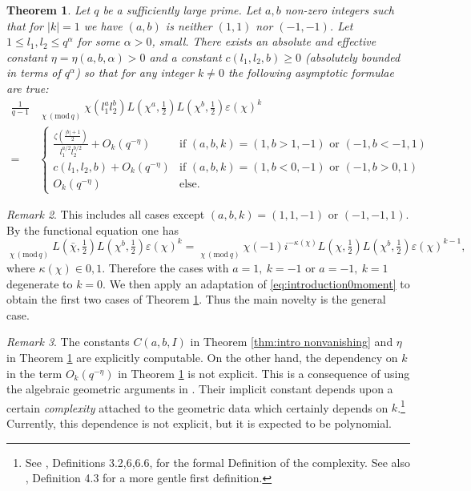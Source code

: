 \documentclass[12pt]{amsart}
\theoremstyle{plain}
\newtheorem{thm}{Theorem}[section]
\theoremstyle{definition}
\theoremstyle{remark}
\newtheorem{rem}[thm]{Remark}
\numberwithin{equation}{section}
\newcommand\sumst{\mathop{{\sum}^\ast}\limits}
\newcommand{\mods}[1]{\,(\mathrm{mod}\,{#1})}
\renewcommand{\geq}{\geqslant}
\renewcommand{\leq}{\leqslant}
\begin{document}
\begin{thm}\label{thm:introduction1}
    Let $q$ be a sufficiently large prime. Let $a,b$ non-zero integers such that for $|k|=1$ we have $(a,b)$ is neither $(1,1)$ nor $(-1,-1)$. Let $1\leq l_1,l_2\leq q^\alpha$ for some $\alpha>0$, small. There exists an absolute and effective constant $\eta = \eta(a,b,\alpha) > 0$ and a constant $c(l_1,l_2,b)\geq0$ (absolutely bounded in terms of $q^\alpha$) so that for any integer $k\neq 0$ the following asymptotic formulae are true:
    \begin{align*}
        \frac{1}{q-1}&\sumst_{\chi \mods{q}}\chi(l_1^al_2^b)L\left(\chi^a,\tfrac{1}{2}\right)L\left(\chi^b,\tfrac{1}{2}\right)\varepsilon(\chi)^k \\ 
     =&\begin{cases} \frac{\zeta\left(\frac{|b|+1}{2}\right)}{l_1^{a/2}l_2^{b/2}}+ O_k( q^{-\eta}) &\text{if }(a,b,k)=(1,b>1,-1) \text{ or } (-1,b<-1,1) \\
          c(l_1,l_2,b)+ O_k( q^{-\eta}) &\text{if } (a,b,k)=(1,b<0,-1) \text{ or } (-1,b>0,1) \\
          O_k( q^{-\eta}) &\text{else.}
        \end{cases}
    \end{align*}
\end{thm}

\begin{rem}\label{rem: the FE and its consequences}
    This includes all cases except $(a,b,k)=(1,1,-1)$ or $(-1,-1,1)$. 
By the functional equation one has 
\begin{equation*}\label{eq the FE and its consequences}
    \sumst_{\chi\mods q}L(\bar\chi,\tfrac 12)L(\chi^b,\tfrac 12)\varepsilon(\chi)^k=\sumst_{\chi\mods q}\chi(-1)i^{-\kappa(\chi)}L(\chi,\tfrac 12)L(\chi^b,\tfrac 12)\varepsilon(\chi)^{k-1},\end{equation*}
where $\kappa(\chi)\in {0,1}$. Therefore the cases with $a=1,\ k=-1$ or $a=-1,\ k=1$ degenerate to $k=0$. We then apply an adaptation of \eqref{eq:introduction0moment} to obtain the first two cases of Theorem \ref{thm:introduction1}. Thus the main novelty is the general case. 
\end{rem}

\begin{rem}The constants $C(a,b,I)$ in Theorem \ref{thm:intro nonvanishing} and $\eta$ in Theorem \ref{thm:introduction1} are explicitly computable. On the other hand, the dependency on $k$ in the term $O_k(q^{-\eta})$ in Theorem \ref{thm:introduction1} is not explicit. 
This is a consequence of using the algebraic geometric arguments in \cite{FKMSbilinear}. Their implicit constant depends upon a certain \emph{complexity} attached to the geometric data which certainly depends on $k$.\footnote{See \cite{SAWIN_FAREEFK_2023}, Definitions 3.2,6,6.6, for the formal Definition of the complexity. See also \cite{AppliedladicCohom}, Definition 4.3 for a more gentle first definition.} Currently, this dependence is not explicit, but it is expected to be polynomial. 
\end{rem}
\end{document}
